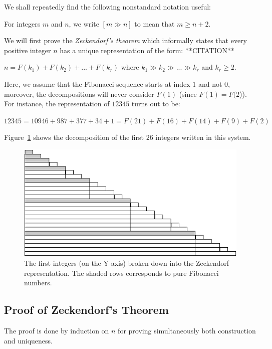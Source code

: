 We shall repeatedly find the following nonstandard notation useful:

For integers $m$ and $n$, we write $[m \gg n]$ to mean that $m \geq
n+2$.

\medskip


We will first prove the \textit{Zeckendorf's theorem} which informally states
that every positive integer $n$ has a unique representation of the
form:  **CITATION**

$n = F(k_1) + F(k_2) + ... + F(k_r)$ where $k_1 \gg k_2 \gg ... \gg k_r$ and $k_r \geq 2$.

Here, we assume that the Fibonacci sequence starts at index $1$ and not $0$,
moreover, the decompositions will never consider $F(1)$ (since $F(1)=F(2$)). 
For instance, the representation of $12345$ turns out to be:

$12345 = 10946 + 987 + 377 + 34 + 1 = F(21) + F(16) + F(14) + F(9) + F(2)$
\bigskip

Figure~\ref{zeckendorf} shows the decomposition of the first 26 integers written in this system. 
\begin{figure}[h]
\begin{center}
        \includegraphics[scale=0.6]{FiguresArithmetic/Zeckendorf}
        \caption{The first integers (on the Y-axis) broken down into the Zeckendorf representation.
        The shaded rows corresponds to pure Fibonacci numbers.}
\label{zeckendorf}
\end{center}
\end{figure}

\subsection{Proof of Zeckendorf's Theorem}

The proof is done by induction on $n$ for proving simultaneously both construction and uniqueness.

